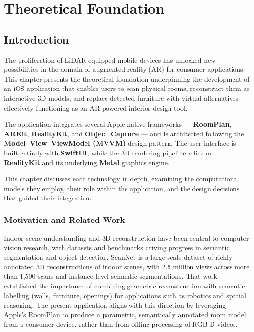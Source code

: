 
\chapter{Theoretical Foundation}
\label{ch:theoretical}

\section{Introduction}
\label{sec:intro}

The proliferation of LiDAR-equipped mobile devices has unlocked new possibilities in the domain of augmented reality (AR) for consumer applications. This chapter presents the theoretical foundation underpinning the development of an iOS application that enables users to scan physical rooms, reconstruct them as interactive 3D models, and replace detected furniture with virtual alternatives — effectively functioning as an AR-powered interior design tool.

The application integrates several Apple-native frameworks — \textbf{RoomPlan}, \textbf{ARKit}, \textbf{RealityKit}, and \textbf{Object Capture} — and is architected following the \textbf{Model–View–ViewModel (MVVM)} design pattern. The user interface is built entirely with \textbf{SwiftUI}, while the 3D rendering pipeline relies on \textbf{RealityKit} and its underlying \textbf{Metal} graphics engine.

This chapter discusses each technology in depth, examining the computational models they employ, their role within the application, and the design decisions that guided their integration.

\subsection{Motivation and Related Work}

Indoor scene understanding and 3D reconstruction have been central to computer vision research, with datasets and benchmarks driving progress in semantic segmentation and object detection. ScanNet \cite{dai2017scannet} is a large-scale dataset of richly annotated 3D reconstructions of indoor scenes, with 2.5 million views across more than 1,500 scans and instance-level semantic segmentations. That work established the importance of combining geometric reconstruction with semantic labelling (walls, furniture, openings) for applications such as robotics and spatial reasoning. The present application aligns with this direction by leveraging Apple's RoomPlan to produce a parametric, semantically annotated room model from a consumer device, rather than from offline processing of RGB-D videos.

